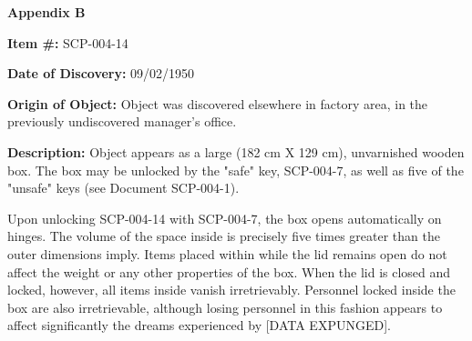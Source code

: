 \begin{flushleft}
\textbf{Appendix B}
\end{flushleft}

\textbf{Item \#:} SCP-004-14

\textbf{Date of Discovery:} 09/02/1950

\textbf{Origin of Object:} Object was discovered elsewhere in factory area, in the previously undiscovered manager's office.

\textbf{Description:} Object appears as a large (182 cm X 129 cm), unvarnished wooden box. The box may be unlocked by the "safe" key, SCP-004-7, as well as five of the "unsafe" keys (see Document SCP-004-1).

Upon unlocking SCP-004-14 with SCP-004-7, the box opens automatically on hinges. The volume of the space inside is precisely five times greater than the outer dimensions imply. Items placed within while the lid remains open do not affect the weight or any other properties of the box. When the lid is closed and locked, however, all items inside vanish irretrievably. Personnel locked inside the box are also irretrievable, although losing personnel in this fashion appears to affect significantly the dreams experienced by [DATA EXPUNGED].
